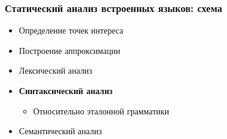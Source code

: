 \documentclass{beamer}
\begin{document}
\begin{frame}
  \transwipe[direction=90]
  \frametitle{Статический анализ встроенных языков: схема}
  \begin{itemize}
    \item Определение точек интереса
    \item Построение аппроксимации
    \item Лексический анализ
    \item \textbf{Синтаксический анализ}
    \begin{itemize}
      \item Относительно эталонной грамматики
    \end{itemize}
    \item Семантический анализ
  \end{itemize}
\end{frame}
\end{document}
